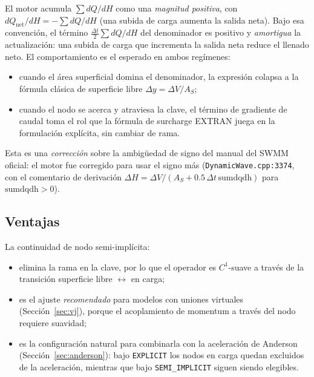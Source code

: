\documentclass[11pt,a4paper]{article}
\begin{document}
El motor acumula $\sum dQ/dH$ como una \emph{magnitud positiva}, con
$dQ_{\mathrm{net}}/dH = -\sum dQ/dH$ (una subida de carga aumenta la salida
neta). Bajo esa convención, el término $\tfrac{\Delta t}{2}\sum dQ/dH$ del
denominador es positivo y \emph{amortigua} la actualización: una subida de
carga que incrementa la salida neta reduce el llenado neto. El comportamiento
es el esperado en ambos regímenes:

\begin{itemize}[nosep]
  \item cuando el área superficial domina el denominador, la expresión colapsa
        a la fórmula clásica de superficie libre $\Delta y = \Delta V/A_S$;
  \item cuando el nodo se acerca y atraviesa la clave, el término de gradiente
        de caudal toma el rol que la fórmula de surcharge EXTRAN juega en la
        formulación explícita, sin cambiar de rama.
\end{itemize}

Esta es una \emph{corrección} sobre la ambigüedad de signo del manual del
SWMM oficial: el motor fue corregido para usar el signo más
(\texttt{DynamicWave.cpp:3374}, con el comentario de derivación
$\Delta H = \Delta V/(A_S + 0.5\,\Delta t\,\mathrm{sumdqdh})$ para
$\mathrm{sumdqdh} > 0$).

\subsection{Ventajas}

La continuidad de nodo semi-implícita:
\begin{itemize}[nosep]
  \item elimina la rama en la clave, por lo que el operador es $C^1$-suave a
        través de la transición superficie libre $\leftrightarrow$ en carga;
  \item es el ajuste \emph{recomendado} para modelos con uniones virtuales
        (Sección~\ref{sec:vj}), porque el acoplamiento de momentum a través del
        nodo requiere suavidad;
  \item es la configuración natural para combinarla con la aceleración de
        Anderson (Sección~\ref{sec:anderson}): bajo \texttt{EXPLICIT} los
        nodos en carga quedan excluidos de la aceleración, mientras que bajo
        \texttt{SEMI\_IMPLICIT} siguen siendo elegibles.
\end{itemize}

\end{document}

